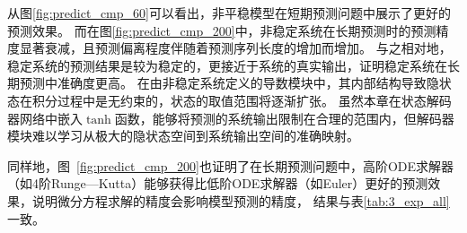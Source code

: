 从图\ref{fig:predict_cmp_60}可以看出，非平稳模型在短期预测问题中展示了更好的预测效果。
而在图\ref{fig:predict_cmp_200}中，非稳定系统在长期预测时的预测精度显著衰减，且预测偏离程度伴随着预测序列长度的增加而增加。
与之相对地，稳定系统的预测结果是较为稳定的，更接近于系统的真实输出，证明稳定系统在长期预测中准确度更高。
在由非稳定系统定义的导数模块中，其内部结构导致隐状态在积分过程中是无约束的，状态的取值范围将逐渐扩张。
虽然本章在状态解码器网络中嵌入$\tanh$函数，能够将预测的系统输出限制在合理的范围内，但解码器模块难以学习从极大的隐状态空间到系统输出空间的准确映射。

同样地，图~\ref{fig:predict_cmp_200}也证明了在长期预测问题中，高阶ODE求解器（如4阶Runge—Kutta）能够获得比低阶ODE求解器（如Euler）更好的预测效果，说明微分方程求解的精度会影响模型预测的精度，
结果与表\ref{tab:3_exp_all}一致。











